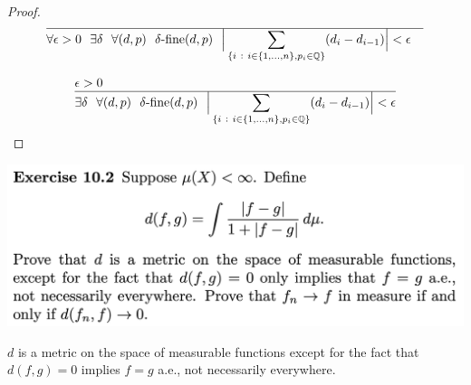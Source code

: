 \begin{proof}
  \begin{align*}
    \hline
    &\forall \epsilon > 0 ~~ \exists \delta ~~ \forall (d, p) ~~ \delta\text{-fine}(d, p) ~~ \Big|\sum_{\{i ~:~ i \in \{1, \ldots, n\}, p_i \in \mathbb{Q}\}} (d_i - d_{i-1})\Big| < \epsilon
  \end{align*}

\begin{align*}
  &\epsilon > 0 \\
  \hline
  &\exists \delta ~~ \forall (d, p) ~~ \delta\text{-fine}(d, p) ~~ \Big|\sum_{\{i ~:~ i \in \{1, \ldots, n\}, p_i \in \mathbb{Q}\}} (d_i - d_{i-1})\Big| < \epsilon
  \end{align*}
\end{proof}
\newpage
\begin{mdframed}
\includegraphics[width=400pt]{img/analysis--berkeley-202a-hw09-b4e1.png}
\end{mdframed}

\begin{claim*}
  $d$ is a metric on the space of measurable functions except for the fact that $d(f, g) = 0$ implies $f = g$
  a.e., not necessarily everywhere.
\end{claim*}

